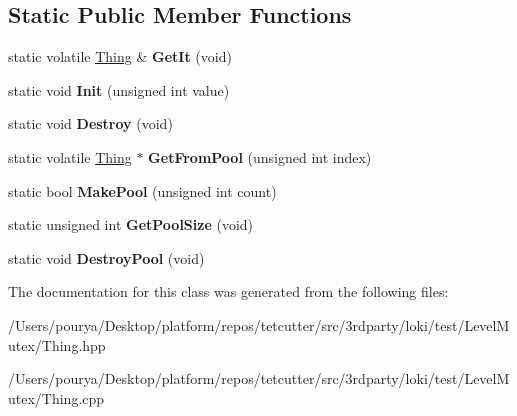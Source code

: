 \subsection*{Static Public Member Functions}
\begin{DoxyCompactItemize}
\item 
\hypertarget{classThing_a12fdd733326faea2c3e63d4164a5ce17}{}static volatile \hyperlink{classThing}{Thing} \& {\bfseries Get\+It} (void)\label{classThing_a12fdd733326faea2c3e63d4164a5ce17}

\item 
\hypertarget{classThing_aca89b512416dd27c637ddaf0e40d68ad}{}static void {\bfseries Init} (unsigned int value)\label{classThing_aca89b512416dd27c637ddaf0e40d68ad}

\item 
\hypertarget{classThing_ab29d47c8fb9945f474f81e3a3771c83c}{}static void {\bfseries Destroy} (void)\label{classThing_ab29d47c8fb9945f474f81e3a3771c83c}

\item 
\hypertarget{classThing_a4a30c592eeff9f9479f8b71c878df947}{}static volatile \hyperlink{classThing}{Thing} $\ast$ {\bfseries Get\+From\+Pool} (unsigned int index)\label{classThing_a4a30c592eeff9f9479f8b71c878df947}

\item 
\hypertarget{classThing_a10a4b1f3b016ba35819a37d484a0710a}{}static bool {\bfseries Make\+Pool} (unsigned int count)\label{classThing_a10a4b1f3b016ba35819a37d484a0710a}

\item 
\hypertarget{classThing_ab1073998d63ab9d9a7cd27626da9d8aa}{}static unsigned int {\bfseries Get\+Pool\+Size} (void)\label{classThing_ab1073998d63ab9d9a7cd27626da9d8aa}

\item 
\hypertarget{classThing_a7dd44417a9bd267843ebc6afc2ed4f77}{}static void {\bfseries Destroy\+Pool} (void)\label{classThing_a7dd44417a9bd267843ebc6afc2ed4f77}

\end{DoxyCompactItemize}


The documentation for this class was generated from the following files\+:\begin{DoxyCompactItemize}
\item 
/\+Users/pourya/\+Desktop/platform/repos/tetcutter/src/3rdparty/loki/test/\+Level\+Mutex/Thing.\+hpp\item 
/\+Users/pourya/\+Desktop/platform/repos/tetcutter/src/3rdparty/loki/test/\+Level\+Mutex/Thing.\+cpp\end{DoxyCompactItemize}
